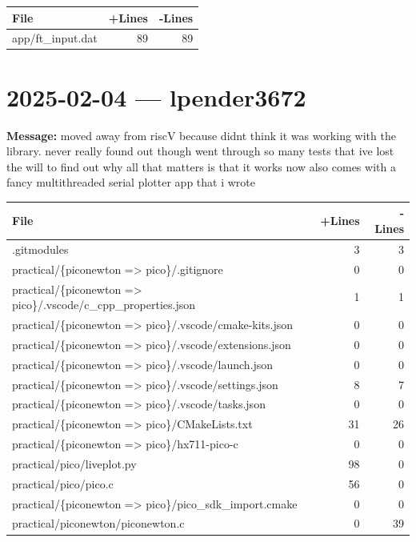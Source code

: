 \documentclass{article}
\begin{document}
\begin{longtable}{|p{10cm}|r|r|}
\hline \textbf{File} & \textbf{+Lines} & \textbf{-Lines} \\
\hline
app/ft\_input.dat & 89 & 89 \\
\hline
\end{longtable}

\section*{2025-02-04 --- lpender3672}
\textbf{Message:} moved away from riscV because didnt think it was working with the library. never really found out though went through so many tests that ive lost the will to find out why all that matters is that it works now also comes with a fancy multithreaded serial plotter app that i wrote

\begin{longtable}{|p{10cm}|r|r|}
\hline \textbf{File} & \textbf{+Lines} & \textbf{-Lines} \\
\hline
.gitmodules & 3 & 3 \\
\hline
practical/\{piconewton => pico\}/.gitignore & 0 & 0 \\
\hline
practical/\{piconewton => pico\}/.vscode/c\_cpp\_properties.json & 1 & 1 \\
\hline
practical/\{piconewton => pico\}/.vscode/cmake-kits.json & 0 & 0 \\
\hline
practical/\{piconewton => pico\}/.vscode/extensions.json & 0 & 0 \\
\hline
practical/\{piconewton => pico\}/.vscode/launch.json & 0 & 0 \\
\hline
practical/\{piconewton => pico\}/.vscode/settings.json & 8 & 7 \\
\hline
practical/\{piconewton => pico\}/.vscode/tasks.json & 0 & 0 \\
\hline
practical/\{piconewton => pico\}/CMakeLists.txt & 31 & 26 \\
\hline
practical/\{piconewton => pico\}/hx711-pico-c & 0 & 0 \\
\hline
practical/pico/liveplot.py & 98 & 0 \\
\hline
practical/pico/pico.c & 56 & 0 \\
\hline
practical/\{piconewton => pico\}/pico\_sdk\_import.cmake & 0 & 0 \\
\hline
practical/piconewton/piconewton.c & 0 & 39 \\
\hline
\end{longtable}
\end{document}
